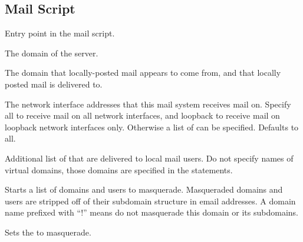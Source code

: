 \subsection{Mail Script}



Entry point in the mail script.


The domain  of the server.


The domain  that locally-posted mail appears to come
from, and that locally posted mail is delivered to.


The network interface addresses that this mail system receives mail on.
Specify all to receive mail on all network interfaces,
and loopback to receive mail on loopback network interfaces only. Otherwise
a list of  can be specified.
Defaults to all.


Additional list of  that are delivered to local mail users.
Do not specify names of virtual domains, those domains are specified
in the  statements.


Starts a list of domains and users to masquerade. Masqueraded domains and
users are stripped off of their subdomain structure in email addresses.
A domain name prefixed with ``!'' means do not masquerade this domain
or its subdomains.


Sets the  to masquerade.

